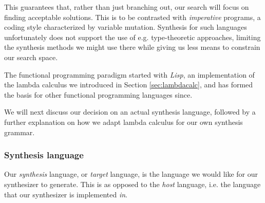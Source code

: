 \documentclass{article}
\begin{document}
This guarantees that, rather than just branching out,
our search will focus on finding acceptable solutions.
This is to be contrasted with \emph{imperative} programs,
a coding style characterized by variable mutation.
Synthesis for such languages
unfortunately
does not support the use of e.g. type-theoretic approaches,
limiting the synthesis methods we might use there
while giving us less means to constrain our search space.

The functional programming paradigm started with \emph{Lisp},
an implementation of the lambda calculus we introduced in Section \ref{sec:lambdacalc},
and has formed the basis for other functional programming languages since.

We will next discuss 
our decision on an actual synthesis language,
followed by a further explanation on how we adapt lambda calculus for our own synthesis grammar.

\subsubsection{Synthesis language}

Our \emph{synthesis} language, or \emph{target} language,
is the language we would like for our synthesizer to generate.
This is as opposed to the \emph{host} language,
i.e. the language that our synthesizer is implemented \emph{in}.
\end{document}
